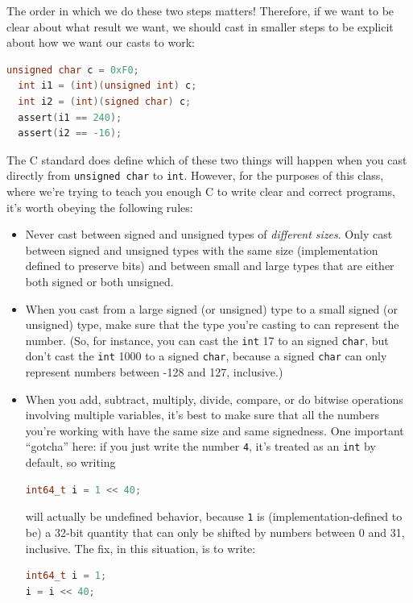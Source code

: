 The order in which we do these two steps matters! Therefore, if we
want to be clear about what result we want, we should cast in smaller
steps to be explicit about how we want our casts to work:
\begin{lstlisting}[language=c]
  unsigned char c = 0xF0;
  int i1 = (int)(unsigned int) c;
  int i2 = (int)(signed char) c;
  assert(i1 == 240);
  assert(i2 == -16);
\end{lstlisting}
The C standard does define which of these two things will happen when
you cast directly from \lstinline'unsigned char' to
\lstinline'int'. However, for the purposes of this class, where we're
trying to teach you enough C to write clear and correct programs, it's worth
obeying the following rules:
\begin{itemize}
\item%
  Never cast between signed and unsigned types of \emph{different
    sizes}.  Only cast between signed and unsigned types with the same
  size (implementation defined to preserve bits) and between small and
  large types that are either both signed or both unsigned.
\item%
  When you cast from a large signed (or unsigned) type to a small
  signed (or unsigned) type, make sure that the type you're casting to
  can represent the number. (So, for instance, you can cast the
  \lstinline'int' 17 to an signed \lstinline'char', but don't cast the
  \lstinline'int' 1000 to a signed \lstinline'char', because a signed
  \lstinline'char' can only represent numbers between -128 and 127,
  inclusive.)
\item%
  When you add, subtract, multiply, divide, compare, or do bitwise
  operations involving multiple variables, it's best to make sure that
  all the numbers you're working with have the same size and same
  signedness. One important ``gotcha'' here: if you just write the
  number \lstinline'4', it's treated as an \lstinline'int' by default,
  so writing
\begin{lstlisting}[language=c]
int64_t i = 1 << 40;
\end{lstlisting}

will actually be undefined behavior, because \lstinline'1' is
(implementation-defined to be) a 32-bit quantity that can only be
shifted by numbers between 0 and 31, inclusive. The fix, in this
situation, is to write:
\begin{lstlisting}[language=c]
int64_t i = 1;
i = i << 40;
\end{lstlisting}
\end{itemize}


